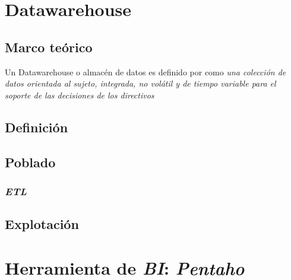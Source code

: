 \section{Datawarehouse}

\subsection{Marco teórico}

Un Datawarehouse o almacén de datos es definido por \autocite{elmasri} como \emph{una colección de datos orientada al sujeto, integrada, no volátil y de tiempo variable para el soporte de las decisiones de los directivos} 

\subsection{Definición}

\subsection{Poblado}

\subsubsection{\emph{ETL}}


\subsection{Explotación}


\section{Herramienta de \emph{BI}: \emph{Pentaho}}






\clearpage
\printbibliography




